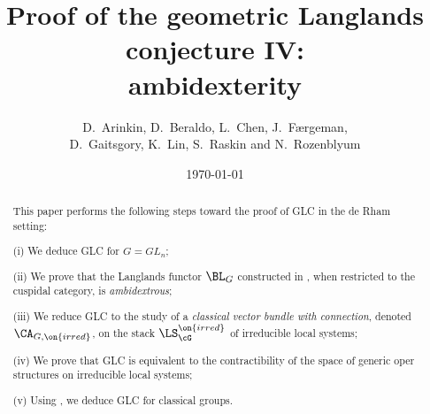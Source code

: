 \documentclass[9pt]{amsart}
\theoremstyle{remark}
\theoremstyle{definition}
\theoremstyle{remark}
\numberwithin{equation}{section}
\begin{document}

\vskip1cm

\title[Proof of the geometric Langlands conjecture IV]{Proof of the geometric Langlands conjecture IV: \\
ambidexterity}



\author[Arinkin, Beraldo, Chen, Faergeman, Gaitsgory, Lin, Raskin, Rozenblyum]
{D.~Arinkin, D.~Beraldo, L.~Chen, J.~F\ae{}rgeman, \\ D.~Gaitsgory, K.~Lin, S.~Raskin and N.~Rozenblyum} 

\date{\today}

\begin{abstract} This paper performs the following steps toward the proof of GLC in the de Rham setting:

\smallskip

\noindent(i) We deduce GLC for $G=GL_n$; 

\noindent(ii) We prove that the Langlands functor $\BL_G$ constructed in \cite{GLC1}, when restricted to the
cuspidal category, is \emph{ambidextrous}; 

\noindent(iii) We reduce GLC to the study of a \emph{classical vector bundle with connection}, 
denoted $\CA_{G,\on{irred}}$, on the stack $\LS_\cG^{\on{irred}}$ of irreducible local systems; 

\noindent(iv) We prove that GLC is equivalent to the contractibility of the space of generic oper structures
on irreducible local systems; 

\noindent(v) Using \cite{BKS}, we deduce GLC for classical groups. 
\end{abstract}



\maketitle


\end{document}
